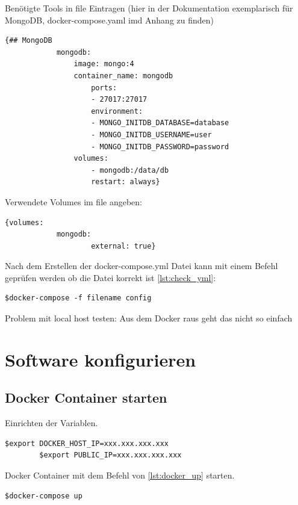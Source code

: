 Ben{\"o}tigte Tools in file Eintragen (hier in der Dokumentation exemplarisch f{\"u}r MongoDB, docker-compose.yaml imd Anhang zu finden)

\begin{lstlisting}[float=h,frame=tb,caption={Auszug docker-compose.yaml MongoDB},label=lst:mongo_docker]
		{## MongoDB
			mongodb:
   				image: mongo:4
   				container_name: mongodb
    				ports:
      				- 27017:27017
    				environment:
      				- MONGO_INITDB_DATABASE=database
      				- MONGO_INITDB_USERNAME=user
      				- MONGO_INITDB_PASSWORD=password
   			 	volumes:
      				- mongodb:/data/db
    				restart: always}
\end{lstlisting}  

Verwendete Volumes im file angeben:
\begin{lstlisting}[float=h,frame=tb,caption={Auszug docker-compose.yaml zum Volume erxtern},label=lst:extern_volume]
		{volumes:
  			mongodb:
    				external: true}
\end{lstlisting}  

Nach dem Erstellen der docker-compose.yml Datei kann mit einem Befehl gepr{\"u}fen werden ob die Datei korrekt ist \ref{lst:check_yml}:
\begin{lstlisting}[float=h,frame=tb,caption={Befehl um .yml auf Korrektheit zu pr{\"u}fen},label=lst:check_yml]
		$docker-compose -f filename config
\end{lstlisting}

Problem mit local host testen: Aus dem Docker raus geht das nicht so einfach

\section{Software konfigurieren}
\label{sec:tool_konfigurieren}

\subsection{Docker Container starten}
Einrichten der Variablen.
\begin{lstlisting}[float=h,frame=tb,caption={Befehl um Docker Container zu starten},label=lst:docker_up]
		$export DOCKER_HOST_IP=xxx.xxx.xxx.xxx
		$export PUBLIC_IP=xxx.xxx.xxx.xxx		
		\end{lstlisting}

Docker Container mit dem Befehl von \ref{lst:docker_up} starten.
\begin{lstlisting}[float=h,frame=tb,caption={Befehl um Docker Container zu starten},label=lst:docker_up]
		$docker-compose up
\end{lstlisting}

